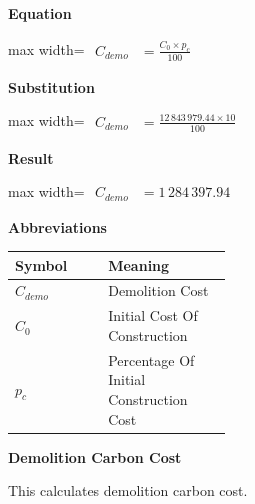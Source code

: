 \documentclass{article}
\begin{document}
\vspace{0.4em}
\textbf{Equation}\par\vspace{-0.35em}
\begin{center}
\begin{adjustbox}{max width=\linewidth}
$\displaystyle\begin{aligned}
C_{demo} &= \frac{C_0 \times p_c}{100}
\end{aligned}$
\end{adjustbox}
\end{center}
\vspace{0.4em}
\textbf{Substitution}\par\vspace{-0.35em}
\begin{center}
\begin{adjustbox}{max width=\linewidth}
$\displaystyle\begin{aligned}
C_{demo} &= \frac{12\,843\,979.44 \times 10}{100}
\end{aligned}$
\end{adjustbox}
\end{center}
\vspace{0.4em}
\textbf{Result}\par\vspace{-0.35em}
\begin{center}
\begin{adjustbox}{max width=\linewidth}
$\displaystyle\begin{aligned}
C_{demo} &= 1\,284\,397.94
\end{aligned}$
\end{adjustbox}
\end{center}
\vspace{0.4em}
\textbf{Abbreviations}\par\vspace{-0.35em}
\begin{tabularx}{\linewidth}{>{\raggedright\arraybackslash}p{0.43\linewidth} >{\raggedright\arraybackslash}X}
\toprule
Symbol & Meaning \\
\midrule
$C_{demo}$ & Demolition Cost \\
$C_0$ & Initial Cost Of Construction \\
$p_c$ & Percentage Of Initial Construction Cost \\
\bottomrule
\end{tabularx}
\vspace{0.6em}
\vspace{0.4em}
\textbf{Demolition Carbon Cost}\par\vspace{-0.35em}
This calculates demolition carbon cost.
\end{document}
